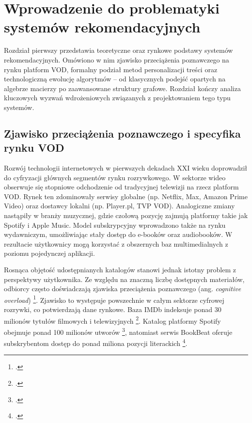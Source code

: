 
\section{Wprowadzenie do problematyki systemów rekomendacyjnych}

Rozdział pierwszy przedstawia teoretyczne oraz rynkowe podstawy systemów rekomendacyjnych. Omówiono w nim zjawisko przeciążenia poznawczego na rynku platform VOD, formalny podział metod personalizacji treści oraz technologiczną ewolucję algorytmów -- od klasycznych podejść opartych na algebrze macierzy po zaawansowane struktury grafowe. Rozdział kończy analiza kluczowych wyzwań wdrożeniowych związanych z projektowaniem tego typu systemów.

\subsection{Zjawisko przeciążenia poznawczego i specyfika rynku VOD} %

Rozwój technologii internetowych w pierwszych dekadach XXI wieku doprowadził do cyfryzacji głównych segmentów rynku rozrywkowego. W sektorze wideo obserwuje się stopniowe odchodzenie od tradycyjnej telewizji na rzecz platform VOD. Rynek ten zdominowały serwisy globalne (np. Netflix, Max, Amazon Prime Video) oraz dostawcy lokalni (np. Player.pl, TVP VOD). Analogiczne zmiany nastąpiły w branży muzycznej, gdzie czołową pozycję zajmują platformy takie jak Spotify i Apple Music. Model subskrypcyjny wprowadzono także na rynku wydawniczym, umożliwiając stały dostęp do e-booków oraz audiobooków. W rezultacie użytkownicy mogą korzystać z obszernych baz multimedialnych z poziomu pojedynczej aplikacji.

Rosnąca objętość udostępnianych katalogów stanowi jednak istotny problem z perspektywy użytkownika. Ze względu na znaczną liczbę dostępnych materiałów, odbiorcy często doświadczają zjawiska przeciążenia poznawczego (ang. \foreignlanguage{english}{\textit{cognitive overload}}) \footcite{bollenUnderstandingChoiceOverload2010}. Zjawisko to występuje powszechnie w całym sektorze cyfrowej rozrywki, co potwierdzają dane rynkowe. Baza IMDb indeksuje ponad 30 milionów tytułów filmowych i telewizyjnych \footcite{PressRoomIMDb}. Katalog platformy Spotify obejmuje ponad 100 milionów utworów \footcite{AboutSpotify}, natomiast serwis BookBeat oferuje subskrybentom dostęp do ponad miliona pozycji literackich \footcite{BookBeatONas}.

